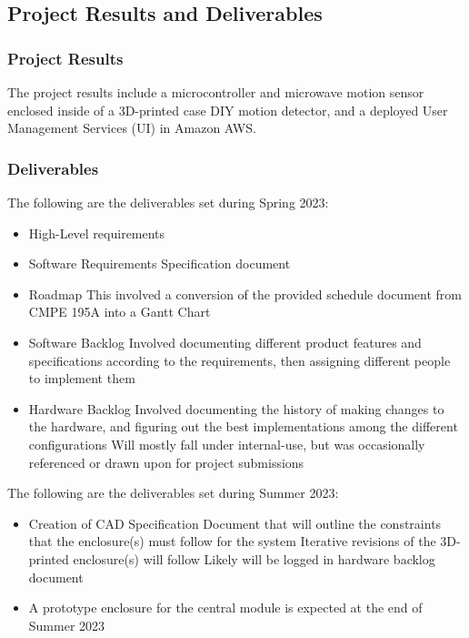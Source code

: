\documentclass[conference]{IEEEtran}
\begin{document}
\subsection{Project Results and Deliverables}

\subsubsection{Project Results}

The project results include a microcontroller and microwave motion sensor enclosed inside of a 3D-printed case DIY motion detector, and a deployed User Management Services (UI) in Amazon AWS.

\subsubsection{Deliverables}

The following are the deliverables set during Spring 2023:
\begin{itemize}
      \item High-Level requirements
      \item Software Requirements Specification document
      \item Roadmap
            \subitem This involved a conversion of the provided schedule document from CMPE 195A into a Gantt Chart
      \item Software Backlog
            \subitem Involved documenting different product features and specifications according to the requirements, then assigning different people to implement them
      \item Hardware Backlog
            \subitem Involved documenting the history of making changes to the hardware, and figuring out the best implementations among the different configurations
            \subitem Will mostly fall under internal-use, but was occasionally referenced or drawn upon for project submissions
\end{itemize}

The following are the deliverables set during Summer 2023:
\begin{itemize}
      \item Creation of CAD Specification Document that will outline the
            constraints that the enclosure(s) must follow for the system
            \subitem Iterative revisions of the 3D-printed enclosure(s) will follow
            \subsubitem Likely will be logged in hardware backlog document
      \item A prototype enclosure for the central module is expected at the end of Summer 2023
\end{itemize}
\end{document}
